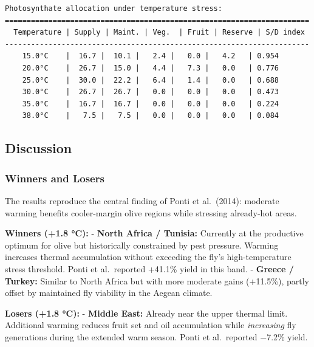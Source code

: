 \begin{verbatim}
Photosynthate allocation under temperature stress:
======================================================================
  Temperature | Supply | Maint. | Veg.  | Fruit | Reserve | S/D index
----------------------------------------------------------------------
    15.0°C    |  16.7 |  10.1 |   2.4 |   0.0 |   4.2   | 0.954
    20.0°C    |  26.7 |  15.0 |   4.4 |   7.3 |   0.0   | 0.776
    25.0°C    |  30.0 |  22.2 |   6.4 |   1.4 |   0.0   | 0.688
    30.0°C    |  26.7 |  26.7 |   0.0 |   0.0 |   0.0   | 0.473
    35.0°C    |  16.7 |  16.7 |   0.0 |   0.0 |   0.0   | 0.224
    38.0°C    |   7.5 |   7.5 |   0.0 |   0.0 |   0.0   | 0.084
\end{verbatim}



\subsection{Discussion}



\label{15635872459172719270}{}


\subsubsection{Winners and Losers}



\label{13516028480131942906}{}


The results reproduce the central finding of Ponti et al.~(2014): moderate warming benefits cooler-margin olive regions while stressing already-hot areas.



\textbf{Winners (+1.8 °C):} - \textbf{North Africa / Tunisia:} Currently at the productive optimum for olive but historically constrained by pest pressure. Warming increases thermal accumulation without exceeding the fly’s high-temperature stress threshold. Ponti et al.~reported +41.1\% yield in this band. - \textbf{Greece / Turkey:} Similar to North Africa but with more moderate gains (+11.5\%), partly offset by maintained fly viability in the Aegean climate.



\textbf{Losers (+1.8 °C):} - \textbf{Middle East:} Already near the upper thermal limit. Additional warming reduces fruit set and oil accumulation while \emph{increasing} fly generations during the extended warm season. Ponti et al.~reported −7.2\% yield.



